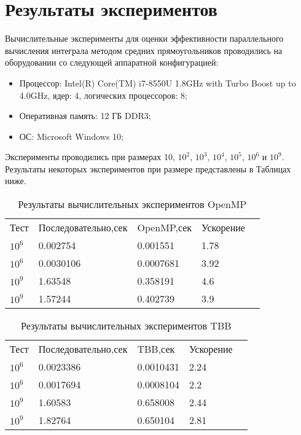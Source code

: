 \documentclass{report}
\begin{document}
\section*{Результаты экспериментов}
Вычислительные эксперименты для оценки эффективности параллельного вычисления интеграла методом средних прямоугольников проводились на оборудовании со следующей аппаратной конфигурацией:

\begin{itemize}
\item Процессор: Intel(R) Core(TM) i7-8550U 1.8GHz with Turbo Boost up to 4.0GHz, ядер: 4, логических процессоров: 8;
\item Оперативная память: 12 ГБ DDR3;
\item ОС: Microsoft Windows 10;
\end{itemize}

\par Эксперименты проводились при размерах 10, $10^2$, $10^3$, $10^4$, $10^5$, $10^6$ и $10^9$. Результаты некоторых экспериментов при размере представлены в Таблицах ниже.

\begin{table}[!h]
\centering
\begin{tabular}{lllll}
Тест & Последовательно,сек & OpenMP,сек & Ускорение  \\
$10^6$ & 0.002754 & 0.001551 & 1.78  \\
$10^6$ & 0.0030106 & 0.0007681 & 3.92  \\
$10^9$ & 1.63548 & 0.358191 & 4.6  \\
$10^9$ & 1.57244 & 0.402739 & 3.9 
\end{tabular}
\caption{Результаты вычислительных экспериментов OpenMP}
\end{table}

\begin{table}[!h]
\centering
\begin{tabular}{lllll}
Тест & Последовательно,сек & TBB,сек & Ускорение  \\
$10^6$ & 0.0023386 & 0.0010431 & 2.24  \\
$10^6$ & 0.0017694 & 0.0008104 & 2.2  \\
$10^9$ & 1.60583 & 0.658008 & 2.44  \\
$10^9$ & 1.82764 & 0.650104 & 2.81
\end{tabular}
\caption{Результаты вычислительных экспериментов TBB}
\end{table}
\end{document}
